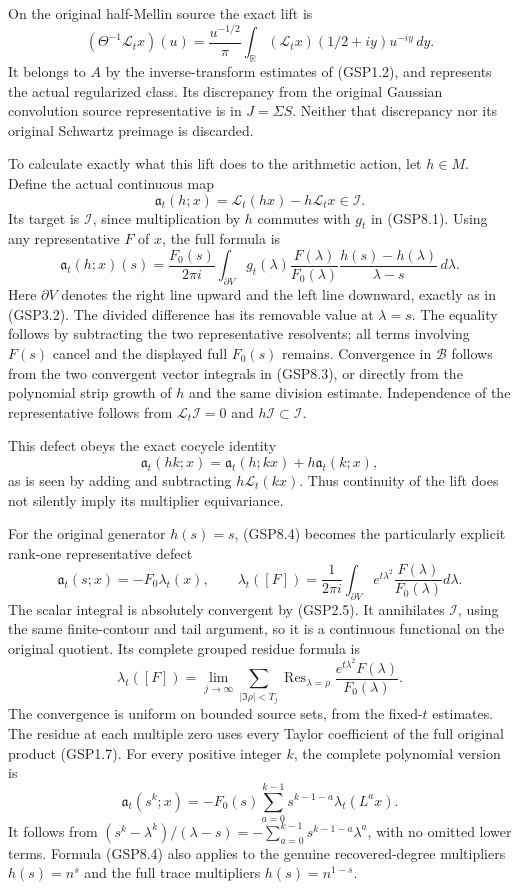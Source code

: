 On the original half-Mellin source the exact lift is \[
(\Theta^{-1}\mathcal L_tx)(u)=\frac{u^{-1/2}}\pi
\int_{\mathbb R}(\mathcal L_tx)(1/2+iy)u^{-iy}\,dy.
\tag{GSP8.2}
\] It belongs to \(A\) by the inverse-transform estimates of (GSP1.2),
and represents the actual regularized class. Its discrepancy from the
original Gaussian convolution source representative is in
\(J=\Sigma S\). Neither that discrepancy nor its original Schwartz
preimage is discarded.

To calculate exactly what this lift does to the arithmetic action, let
\(h\in M\). Define the actual continuous map \[
\mathfrak a_t(h;x)=\mathcal L_t(hx)-h\mathcal L_tx\in\mathcal I.
\tag{GSP8.3}
\] Its target is \(\mathcal I\), since multiplication by \(h\) commutes
with \(g_t\) in (GSP8.1). Using any representative \(F\) of \(x\), the
full formula is \[
\mathfrak a_t(h;x)(s)=\frac{F_0(s)}{2\pi i}
\int_{\partial V}g_t(\lambda)\frac{F(\lambda)}{F_0(\lambda)}
\frac{h(s)-h(\lambda)}{\lambda-s}\,d\lambda.
\tag{GSP8.4}
\] Here \(\partial V\) denotes the right line upward and the left line
downward, exactly as in (GSP3.2). The divided difference has its
removable value at \(\lambda=s\). The equality follows by subtracting
the two representative resolvents; all terms involving \(F(s)\) cancel
and the displayed full \(F_0(s)\) remains. Convergence in \(\mathcal B\)
follows from the two convergent vector integrals in (GSP8.3), or
directly from the polynomial strip growth of \(h\) and the same division
estimate. Independence of the representative follows from
\(\mathscr L_t\mathcal I=0\) and \(h\mathcal I\subset\mathcal I\).

This defect obeys the exact cocycle identity \[
\mathfrak a_t(hk;x)=\mathfrak a_t(h;kx)+h\mathfrak a_t(k;x),
\tag{GSP8.5}
\] as is seen by adding and subtracting \(h\mathcal L_t(kx)\). Thus
continuity of the lift does not silently imply its multiplier
equivariance.

For the original generator \(h(s)=s\), (GSP8.4) becomes the particularly
explicit rank-one representative defect \[
\mathfrak a_t(s;x)=-F_0\lambda_t(x),\qquad
\lambda_t([F])=\frac1{2\pi i}\int_{\partial V}
e^{t\lambda^2}\frac{F(\lambda)}{F_0(\lambda)}d\lambda.
\tag{GSP8.6}
\] The scalar integral is absolutely convergent by (GSP2.5). It
annihilates \(\mathcal I\), using the same finite-contour and tail
argument, so it is a continuous functional on the original quotient. Its
complete grouped residue formula is \[
\lambda_t([F])=\lim_{j\to\infty}
\sum_{|\Im\rho|<T_j}
\operatorname{Res}_{\lambda=\rho}
\frac{e^{t\lambda^2}F(\lambda)}{F_0(\lambda)}.
\tag{GSP8.7}
\] The convergence is uniform on bounded source sets, from the
fixed-\(t\) estimates. The residue at each multiple zero uses every
Taylor coefficient of the full original product (GSP1.7). For every
positive integer \(k\), the complete polynomial version is \[
\mathfrak a_t(s^k;x)
=-F_0(s)\sum_{a=0}^{k-1}s^{k-1-a}\lambda_t(L^a x).
\tag{GSP8.8}
\] It follows from
\((s^k-\lambda^k)/(\lambda-s)=-\sum_{a=0}^{k-1}s^{k-1-a}\lambda^a\),
with no omitted lower terms. Formula (GSP8.4) also applies to the
genuine recovered-degree multipliers \(h(s)=n^s\) and the full trace
multipliers \(h(s)=n^{1-s}\).


